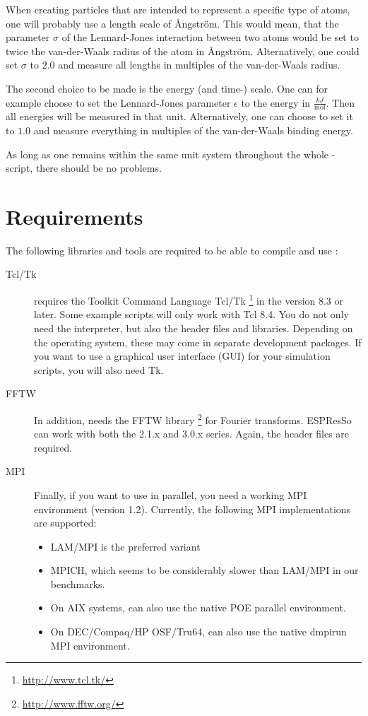 When creating particles that are intended to represent a specific type
of atoms, one will probably use a length scale of \AA ngstr\"om.  This
would mean, that \eg the parameter $\sigma$ of the Lennard-Jones
interaction between two atoms would be set to twice the van-der-Waals
radius of the atom in \AA ngstr\"om.  Alternatively, one could set
$\sigma$ to $2.0$ and measure all lengths in multiples of the
van-der-Waals radius.

The second choice to be made is the energy (and time-) scale.  One can
for example choose to set the Lennard-Jones parameter $\epsilon$ to
the energy in $\frac{kJ}{\mathrm{mol}}$.  Then all energies will be
measured in that unit.  Alternatively, one can choose to set it to
$1.0$ and measure everything in multiples of the van-der-Waals binding
energy.

As long as one remains within the same unit system throughout the
whole \es-script, there should be no problems.

\section{Requirements}
\label{sec:requirements}

The following libraries and tools are required to be able to compile
and use \es:

\begin{description}
\item[Tcl/Tk]  \es{} requires the Toolkit Command
  Language Tcl/Tk \footnote{\url{http://www.tcl.tk/}} in the version
  8.3 or later.  Some example scripts will only work with Tcl 8.4. You
  do not only need the interpreter, but also the header files and
  libraries.  Depending on the operating system, these may come in
  separate development packages. If you want to use a graphical user
  interface (GUI) for your simulation scripts, you will also need Tk.
  
\item[FFTW]  In addition, \es{} needs the FFTW library
  \footnote{\url{http://www.fftw.org/}} for Fourier transforms.
  ESPResSo can work with both the 2.1.x and 3.0.x series. Again, the
  header files are required.
  
\item[MPI]  Finally, if you want to use \es{} in parallel,
  you need a working MPI environment (version 1.2). Currently, the
  following MPI implementations are supported:
  \begin{itemize}
  \item LAM/MPI is the preferred variant
  \item MPICH, which seems to be considerably slower than LAM/MPI in
    our benchmarks.
  \item On AIX systems, \es{} can also use the native POE parallel
    environment.
  \item On DEC/Compaq/HP OSF/Tru64, \es{} can also use the native
    dmpirun MPI environment.
  \end{itemize}
\end{description}


